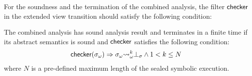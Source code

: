 For the soundness and the termination of the combined analysis, the filter
$\textsf{checker}$ in the extended view transition should satisfy the following
condition:
\begin{theorem}
  The combined analysis has sound analysis result and terminates in a finite
  time if its abstract semantics is sound and $\textsf{checker}$ satisfies the following
  condition:
  \[
    \textsf{checker}({\sigma}_\omega) \Rightarrow {\sigma}_\omega {\leadsto}_\omega^k \bot_\sigma \wedge
    1 < k \leq N
  \]
  where $N$ is a pre-defined maximum length of the sealed symbolic execution.
\end{theorem}
